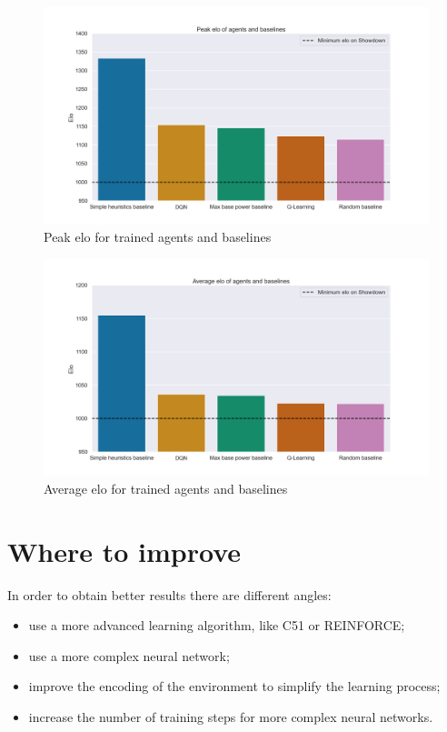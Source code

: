 \documentclass{article}
\begin{document}
\begin{figure}
    \centering
    \includegraphics[width=\textwidth]{img/peak.png}
    \caption{Peak elo for trained agents and baselines}
    \label{peak_elo}
\end{figure}

\begin{figure}
    \centering
    \includegraphics[width=\textwidth]{img/mean.png}
    \caption{Average elo for trained agents and baselines}
    \label{avg_elo}
\end{figure}

\section{Where to improve}

In order to obtain better results there are different angles:
\begin{itemize}
    \item use a more advanced learning algorithm, like C51 or REINFORCE;
    \item use a more complex neural network;
    \item improve the encoding of the environment to simplify the learning process;
    \item increase the number of training steps for more complex neural networks.
\end{itemize}

\clearpage

\printbibliography
\end{document}
